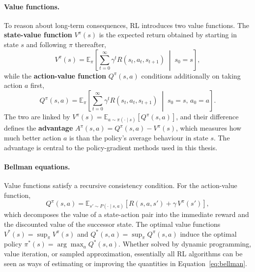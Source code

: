 \paragraph{Value functions.}
To reason about long-term consequences, RL introduces two value functions. The
\textbf{state-value function} $V^{\pi}(s)$ is the expected return obtained by
starting in state $s$ and following $\pi$ thereafter,
\begin{equation}
    V^{\pi}(s) = \mathbb{E}_{\pi}\!\left[ \sum_{t=0}^{\infty} \gamma^t R(s_t, a_t, s_{t+1}) \;\middle|\; s_0 = s \right],
\end{equation}
while the \textbf{action-value function} $Q^{\pi}(s, a)$ conditions additionally
on taking action $a$ first,
\begin{equation}
    Q^{\pi}(s, a) = \mathbb{E}_{\pi}\!\left[ \sum_{t=0}^{\infty} \gamma^t R(s_t, a_t, s_{t+1}) \;\middle|\; s_0 = s,\, a_0 = a \right].
\end{equation}
The two are linked by $V^{\pi}(s) = \mathbb{E}_{a \sim \pi(\cdot \mid s)}[Q^{\pi}(s,
a)]$, and their difference defines the \textbf{advantage} $A^{\pi}(s, a) =
Q^{\pi}(s, a) - V^{\pi}(s)$, which measures how much better action $a$ is than
the policy's average behaviour in state $s$. The advantage is central to the
policy-gradient methods used in this thesis.

\paragraph{Bellman equations.}
Value functions satisfy a recursive consistency condition. For the action-value
function,
\begin{equation}
    Q^{\pi}(s, a) = \mathbb{E}_{s' \sim P(\cdot \mid s, a)}\!\left[ R(s, a, s') + \gamma\, V^{\pi}(s') \right],
    \label{eq:bellman}
\end{equation}
which decomposes the value of a state-action pair into the immediate reward and
the discounted value of the successor state. The optimal value functions
$V^{*}(s) = \sup_{\pi} V^{\pi}(s)$ and $Q^{*}(s, a) = \sup_{\pi} Q^{\pi}(s, a)$
induce the optimal policy $\pi^{*}(s) = \arg\max_{a} Q^{*}(s, a)$. Whether solved
by dynamic programming, value iteration, or sampled approximation, essentially
all RL algorithms can be seen as ways of estimating or improving the quantities
in Equation~\ref{eq:bellman}.

